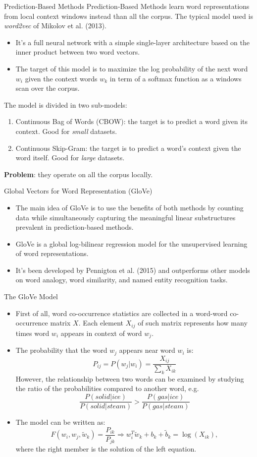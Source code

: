 \documentclass{beamer}
\begin{document}
\begin{frame}{Prediction-Based Methods}
	Prediction-Based Methods learn word representations from local context windows instead than all the corpus. The typical model used is \textit{word2vec} of Mikolov et al. (2013). 
	\begin{itemize}
		\item It's a full neural network with a simple single-layer architecture based 	on the inner product between two word vectors.
		\item The target of this model is to maximize the log probability of the next word $w_i$ given the context words $w_k$ in term of a softmax function as a windows scan over the corpus.
	\end{itemize}
	The model is divided in two sub-models:
	\begin{enumerate}
		\item Continuous Bag of Words (CBOW): the target is to predict a word given its context. Good for \textit{small} datasets.
		\item Continuous Skip-Gram: the target is to predict a word's context given the word itself. Good for \textit{large} datasets.
	\end{enumerate}
	\textbf{Problem}: they operate on all the corpus locally.
\end{frame}
\begin{frame}{Global Vectors for Word Representation (GloVe)}
	\begin{itemize}\setlength\itemsep{1em}
		\item The main idea of GloVe is to use the benefits of both methods by counting data while simultaneously capturing the meaningful linear substructures prevalent in prediction-based methods.
		\item GloVe is a global log-bilinear regression model for the unsupervised learning of word representations.
		\item It's been developed by Pennigton et al. (2015) and outperforms other models on word analogy, word similarity, and named entity recognition tasks.
	\end{itemize}
\end{frame}
\begin{frame}{The GloVe Model}
	\begin{itemize}
		\item First of all, word co-occurrence statistics are collected in a word-word co-occurrence matrix $X$. Each element $X_{ij}$ of such matrix represents how many times word $w_i$ appears in context of word $w_j$.
		\item The probability that the word $w_j$ appears near word $w_i$ is:
		$$P_{ij} = P(w_j | w_i) = \frac{X_{ij}}{\sum_{k}X_{ik}}$$
		However, the relationship between two words can be examined by studying the ratio of the probabilities compared to another word, e.g.
		$$\frac{P(solid|ice)}{P(solid|steam)} > \frac{P(gas|ice)}{P(gas|steam)}$$
		\item The model can be written as:
		$$F(w_i, w_j, \widetilde{w}_k) = \frac{P_{ik}}{P_{jk}} \Longrightarrow w_i^T \widetilde{w}_k + b_k + \widetilde{b}_k = \log \left(X_{ik}\right),$$
		where the right member is the solution of the left equation.
	\end{itemize}
\end{frame}
\end{document}

